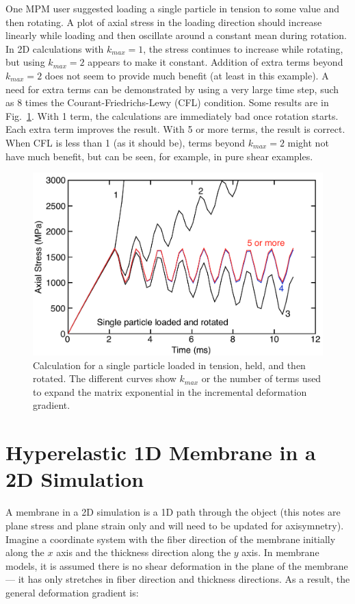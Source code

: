 \documentclass[11pt]{book}
\begin{document}
One MPM user suggested loading a single particle in tension to some value and then rotating. A plot of axial stress in the loading direction should increase linearly while loading and then oscillate around a constant mean during rotation. In 2D calculations with $k_{max}=1$, the stress continues to increase while rotating, but using $k_{max}=2$ appears to make it constant. Addition of extra terms beyond $k_{max}=2$ does not seem to provide much benefit (at least in this example). A need for extra terms can be demonstrated by using a very large time step, such as 8 times the Courant-Friedrichs-Lewy (CFL) condition. Some results are in Fig.~\ref{dFCalc}. With 1 term, the calculations are immediately bad once rotation starts. Each extra term improves the result. With 5 or more terms, the result is correct. When CFL is less than 1 (as it should be), terms beyond $k_{max}=2$ might not have much benefit, but can be seen, for example, in pure shear examples.
\begin{figure}
\begin{center}
\includegraphics[width=5in]{IncrementalDef}
\caption{Calculation for a single particle loaded in tension, held, and then rotated. The different curves show $k_{max}$ or the number of terms used to expand the matrix exponential in the incremental deformation gradient.}
\label{dFCalc}
\end{center}
\end{figure}


\section{Hyperelastic 1D Membrane in a 2D Simulation}

A membrane in a 2D simulation is a 1D path through the object (this notes are plane stress and plane strain only and will need to be updated for axisymnetry). Imagine a coordinate system with the fiber direction of the membrane initially along the $x$ axis and the thickness direction along the $y$ axis. In membrane models, it is assumed there is no shear deformation in the plane of the membrane --- it has only stretches in fiber direction and thickness directions. As a result, the general deformation gradient is:
\end{document}
